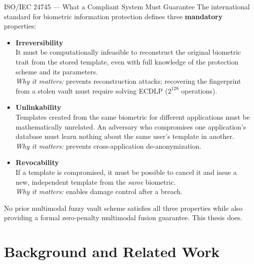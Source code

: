 \documentclass[aspectratio=169,10pt]{beamer}
\newcommand{\tick}{{\color{Forest}$\checkmark$}}
\begin{document}
\begin{frame}{ISO/IEC 24745 --- What a Compliant System Must Guarantee}
\footnotesize
The international standard for biometric information protection
defines three \textbf{mandatory} properties:
\medskip
\begin{itemize}
  \item[\tick] \textbf{Irreversibility}\\
        {\scriptsize
        It must be computationally infeasible to reconstruct the original
        biometric trait from the stored template, even with full knowledge
        of the protection scheme and its parameters.\\
        \emph{Why it matters:} prevents reconstruction attacks;
        recovering the fingerprint from a stolen vault must require
        solving ECDLP ($2^{128}$ operations).}
  \item[\tick] \textbf{Unlinkability}\\
        {\scriptsize
        Templates created from the same biometric for different
        applications must be mathematically unrelated.
        An adversary who compromises one application's database must
        learn nothing about the same user's template in another.\\
        \emph{Why it matters:} prevents cross-application de-anonymization.}
  \item[\tick] \textbf{Revocability}\\
        {\scriptsize
        If a template is compromised, it must be possible to cancel it
        and issue a new, independent template from the \emph{same} biometric.\\
        \emph{Why it matters:} enables damage control after a breach.}
\end{itemize}
\medskip
{\scriptsize\color{DGrey}
No prior multimodal fuzzy vault scheme satisfies all three properties
while also providing a formal zero-penalty multimodal fusion guarantee.
This thesis does.}
\end{frame}

\section{Background and Related Work}
\end{document}
